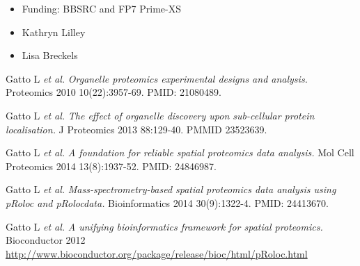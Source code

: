 \documentclass[presentation]{beamer}
\begin{document}
\begin{frame}
  \begin{itemize}
  \item Funding: BBSRC and FP7 Prime-XS
  \item Kathryn Lilley
  \item Lisa Breckels
  \end{itemize}

  \begin{tiny}
    
    \begin{thebibliography}{9}

     Gatto L \textit{et al.}
      \emph{Organelle proteomics experimental designs and analysis.}
      Proteomics 2010 10(22):3957-69. PMID: 21080489.

     Gatto L \textit{et al.}
      \emph{The effect of organelle discovery upon sub-cellular protein localisation.}
      J Proteomics 2013 88:129-40. PMMID 23523639.

     Gatto L \textit{et al.}
      \emph{A foundation for reliable spatial proteomics data analysis.}
      Mol Cell Proteomics 2014 13(8):1937-52. PMID: 24846987.

     Gatto L \textit{et al.}
      \emph{Mass-spectrometry-based spatial proteomics data analysis
        using {pRoloc} and {pRolocdata}.}  
      Bioinformatics 2014 30(9):1322-4. PMID: 24413670.

     Gatto L \textit{et al.}
      \emph{A unifying bioinformatics framework for spatial proteomics.}  
      Bioconductor 2012 
      \url{http://www.bioconductor.org/package/release/bioc/html/pRoloc.html}

    \end{thebibliography}

  \end{tiny}

\end{frame}
\end{document}
